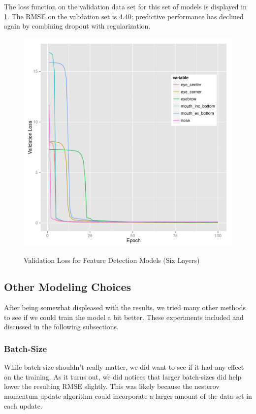 \documentclass[journal]{IEEEtran}
\begin{document}
The loss function on the validation data set for this set of models is displayed in \cref{fig:val_loss_6_level_inverted_hourglass_reg_do}. The RMSE on the validation set is 4.40; predictive performance has declined again by combining dropout with regularization.

\begin{figure}[!htb]
  \centering
  \caption{Validation Loss for Feature Detection Models (Six Layers)}
  \includegraphics[scale=.49]{val_loss_6_level_inverted_hourglass_reg_do.pdf}
  \label{fig:val_loss_6_level_inverted_hourglass_reg_do}
\end{figure}



\subsection{Other Modeling Choices}

After being somewhat displeased with the results, we tried many other methods to see if we could train the model a bit better.  These experiments included and discussed in the following subsections.

\subsubsection{Batch-Size}
While batch-size shouldn't really matter, we did want to see if it had any effect on the training.  As it turns out, we did notices that larger batch-sizes did help lower the resulting RMSE slightly.  This was likely because the nesterov momentum update algorithm could incorporate a larger amount of the data-set in each update.
\end{document}
